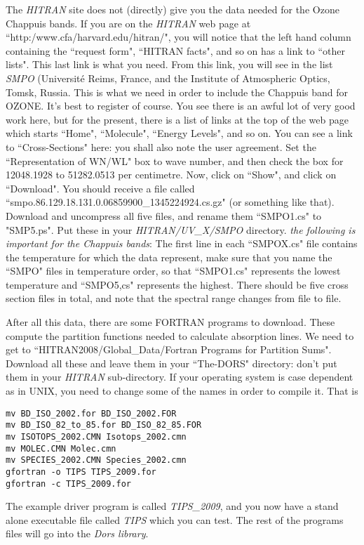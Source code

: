 \documentclass[12pt]{article}
\begin{document}
The {\it HITRAN} site does not
 (directly) give you the data needed for the Ozone Chappuis
bands. If you are on the {\it HITRAN} web page at
 ``http:/www.cfa/harvard.edu/hitran/", you will notice that
the left hand column containing the ``request form", ``HITRAN facts", and so on has a link to ``other lists". This last link is what you need. From this link, you will see in the list {\it SMPO}
 (Universit\'{e} Reims, France, and the Institute of Atmospheric Optics, Tomsk, Russia. This is what we need in order to include
the Chappuis band for OZONE. It's best to register of course.
You see there is an awful lot of very good work here, but for
the present, there is a list of links at the top of the web page
which starts ``Home", ``Molecule", ``Energy Levels", and so on.
You can see a link to ``Cross-Sections" here: you shall also note the user agreement. Set the ``Representation of WN/WL" box to
wave number, and then check the box for 12048.1928 to 51282.0513 per centimetre. Now, click on ``Show", and click on ``Download". You should
receive a file called ``smpo.86.129.18.131.0.06859900\_1345224924.cs.gz" 
(or something like that). Download and uncompress all five files, and rename them ``SMPO1.cs" to "SMP5.ps".
Put these in your {\it HITRAN/UV\_X/SMPO} directory. {\it the following is important for the Chappuis bands}: The first line in each ``SMPOX.cs" file contains the temperature for which the data represent,
 make sure that you name the ``SMPO" files in temperature order, so that ``SMPO1.cs" represents
the lowest temperature and ``SMPO5,cs" represents the highest. There should be five cross section
files in total, and note that the spectral range changes from file to file.

After all this data, there are some FORTRAN programs to download. These compute the
partition functions needed to calculate absorption lines.
We need to get to ``HITRAN2008/Global\_Data/Fortran Programs for Partition Sums".
Download all these and leave them in your ``The-DORS" directory: don't put them in your {\it HITRAN}
sub-directory.
 If your operating 
system is case dependent as in UNIX, you need to change some of the names in order to compile it. That is
\begin{verbatim}
mv BD_ISO_2002.for BD_ISO_2002.FOR
mv BD_ISO_82_to_85.for BD_ISO_82_85.FOR
mv ISOTOPS_2002.CMN Isotops_2002.cmn
mv MOLEC.CMN Molec.cmn
mv SPECIES_2002.CMN Species_2002.cmn
gfortran -o TIPS TIPS_2009.for
gfortran -c TIPS_2009.for
\end{verbatim}
The example driver program is called {\it TIPS\_2009}, and you now have a stand alone executable file called {\it TIPS} which you can test. The rest of the 
programs files will go into the {\it Dors library}.
\end{document}

